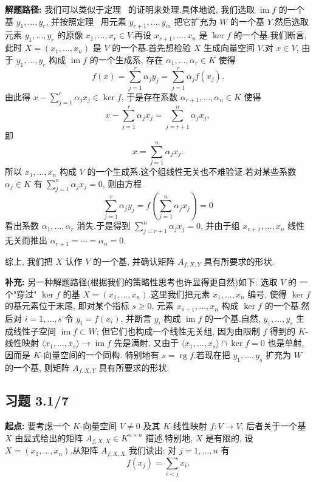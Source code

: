 \noindent\textbf{解题路径:} 我们可以类似于定理~ 的证明来处理.具体地说,
我们选取 $\operatorname{im} f$ 的一个基 $y_1, \ldots, y_r$, 并按照定理~
用元素 $y_{r+1}, \ldots, y_m$ 把它扩充为 $W$ 的一个基 $Y$.然后选取元素 $y_1, \ldots, y_r$
的原像 $x_1, \ldots, x_r \in V$.再设 $x_{r+1}, \ldots, x_n$ 是 $\ker f$ 的一个基.我们断言,
此时 $X = (x_1, \ldots, x_n)$ 是 $V$ 的一个基.首先想检验 $X$ 生成向量空间 $V$.对
$x \in V$, 由于 $y_1, \ldots, y_r$ 构成 $\operatorname{im} f$ 的一个生成系, 存在
$\alpha_1, \ldots, \alpha_r \in K$ 使得
\[
f(x) = \sum_{j = 1}^{r} \alpha_j y_j = \sum_{j = 1}^{r} \alpha_j f(x_j)\text{.}
\]
由此得 $x - \sum_{j = 1}^{r} \alpha_j x_j \in \ker f$, 于是存在系数
$\alpha_{r+1}, \ldots, \alpha_n \in K$ 使得
\[
x - \sum_{j = 1}^{r} \alpha_j x_j = \sum_{j = r + 1}^{n} \alpha_j x_j,
\]
即
\[
x = \sum_{j = 1}^{n} \alpha_j x_j\text{.}
\]
所以 $x_1, \ldots, x_n$ 构成 $V$ 的一个生成系.这个组线性无关也不难验证.若对某些系数
$\alpha_j \in K$ 有 $\sum_{j = 1}^{n} \alpha_j x_j = 0$, 则由方程
\[
\sum_{j = 1}^{r} \alpha_j y_j = f\left(\sum_{j = 1}^{n} \alpha_j x_j\right) = 0
\]
看出系数 $\alpha_1, \ldots, \alpha_r$ 消失.于是得到 $\sum_{j = r + 1}^{n} \alpha_j x_j = 0$,
并由于组 $x_{r+1}, \ldots, x_n$ 线性无关而推出 $\alpha_{r+1} = \cdots = \alpha_n = 0$.

综上, 我们把 $X$ 认作 $V$ 的一个基, 并确认矩阵 $A_{f, X, Y}$ 具有所要求的形状.

\noindent\textbf{补充:} 另一种解题路径(根据我们的策略性思考也许显得更自然)如下: 选取 $V$ 的
一个"穿过" $\ker f$ 的基 $X = (x_1, \ldots, x_n)$.这里我们把元素 $x_1, \ldots, x_n$ 编号,
使得 $\ker f$ 的基元素位于末尾, 即对某个指标 $s \geq 0$, 元素 $x_{s+1}, \ldots, x_n$ 构成
$\ker f$ 的一个基.然后对 $i = 1, \ldots, s$ 令 $y_i = f(x_i)$, 并断言 $y_i$ 构成
$\operatorname{im} f$ 的一个基.自然, $y_1, \ldots, y_s$ 生成线性子空间
$\operatorname{im} f \subset W$; 但它们也构成一个线性无关组, 因为由限制 $f$ 得到的 $K$-线性映射
$\langle x_1, \ldots, x_s \rangle \longrightarrow \operatorname{im} f$ 先是满射, 又由于
$\langle x_1, \ldots, x_s \rangle \cap \ker f = 0$ 也是单射, 因而是 $K$-向量空间的一个同构.
特别地有 $s = \operatorname{rg} f$.若现在把 $y_1, \ldots, y_s$ 扩充为 $W$ 的一个基, 则矩阵
$A_{f, X, Y}$ 具有所要求的形状.

\subsection*{习题 3.1/7}

\noindent\textbf{起点:} 要考虑一个 $K$-向量空间 $V \neq 0$ 及其 $K$-线性映射
$f \colon V \longrightarrow V$, 后者关于一个基 $X$ 由显式给出的矩阵
$A_{f, X, X} \in K^{n \times n}$ 描述.特别地, $X$ 是有限的, 设
$X = (x_1, \ldots, x_n)$.从矩阵 $A_{f, X, X}$ 我们读出: 对 $j = 1, \ldots, n$ 有
\[
f(x_j) = \sum_{i < j} x_i\text{.}
\]

